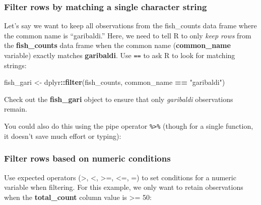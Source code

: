 \documentclass[]{book}
\newenvironment{Shaded}{\begin{snugshade}}{\end{snugshade}}
\newcommand{\KeywordTok}[1]{\textcolor[rgb]{0.13,0.29,0.53}{\textbf{#1}}}
\newcommand{\NormalTok}[1]{#1}
\newcommand{\OperatorTok}[1]{\textcolor[rgb]{0.81,0.36,0.00}{\textbf{#1}}}
\newcommand{\StringTok}[1]{\textcolor[rgb]{0.31,0.60,0.02}{#1}}
\begin{document}
\hypertarget{filter-rows-by-matching-a-single-character-string}{%
\subsubsection{Filter rows by matching a single character string}\label{filter-rows-by-matching-a-single-character-string}}

Let's say we want to keep all observations from the fish\_counts data frame where the common name is ``garibaldi.'' Here, we need to tell R to only \emph{keep rows} from the \textbf{fish\_counts} data frame when the common name (\textbf{common\_name} variable) exactly matches \textbf{garibaldi}.
Use \texttt{==} to ask R to look for matching strings:

\begin{Shaded}
\begin{Highlighting}[]
\NormalTok{fish_gari <-}\StringTok{ }\NormalTok{dplyr}\OperatorTok{::}\KeywordTok{filter}\NormalTok{(fish_counts, common_name }\OperatorTok{==}\StringTok{ "garibaldi"}\NormalTok{)}
\end{Highlighting}
\end{Shaded}

Check out the \textbf{fish\_gari} object to ensure that only \emph{garibaldi} observations remain.

You could also do this using the pipe operator \texttt{\%\textgreater{}\%} (though for a single function, it doesn't save much effort or typing):

\begin{Shaded}
\end{Shaded}

\hypertarget{filter-rows-based-on-numeric-conditions}{%
\subsubsection{Filter rows based on numeric conditions}\label{filter-rows-based-on-numeric-conditions}}

Use expected operators (\textgreater{}, \textless{}, \textgreater{}=, \textless{}=, =) to set conditions for a numeric variable when filtering. For this example, we only want to retain observations when the \textbf{total\_count} column value is \textgreater{}= 50:
\end{document}

